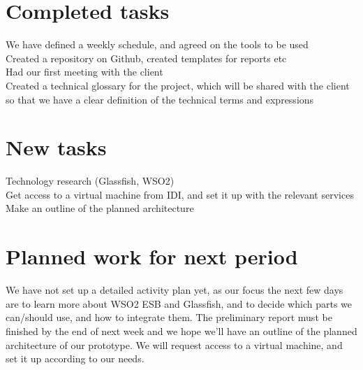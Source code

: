 \documentclass[titlepage]{article}
\begin{document}
    \section*{Completed tasks}
        We have defined a weekly schedule, and agreed on the tools to be used
\\Created a repository on Github, created templates for reports etc
\\Had our first meeting with the client
\\Created a technical glossary for the project, which will be shared with the client so that we have a clear definition of the technical terms and expressions

    \section*{New tasks}
        Technology research (Glassfish, WSO2)
\\Get access to a virtual machine from IDI, and set it up with the relevant services
\\Make an outline of the planned architecture

    \section*{Planned work for next period}
        We have not set up a detailed activity plan yet, as our focus the next few days are to learn more about WSO2 ESB and Glassfish, and to decide which parts we can/should use, and how to integrate them. The preliminary report must be finished by the end of next week and we hope we’ll have an outline of the planned architecture of our prototype. We will request access to a virtual machine, and set it up according to our needs.
\end{document}
